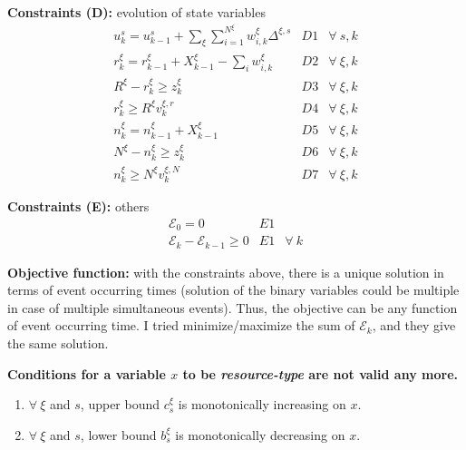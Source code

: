 \documentclass[]{interact}
\theoremstyle{plain}%
\theoremstyle{definition}
\theoremstyle{remark}
\begin{document}
\textbf{Constraints (D):} evolution of state variables
\begin{eqnarray}
u^{s}_{k} = u^s_{k-1} + \sum_{\xi} \sum_{i=1}^{N^{\xi}} w^{\xi}_{i,k} \Delta^{\xi,s}&D1& \forall\ s,k\\
r^{\xi}_k = r^{\xi}_{k-1} + X^{\xi}_{k-1} - \sum_i w^{\xi}_{i,k} &D2& \forall\ \xi,k\\
R^{\xi} - r^{\xi}_k \ge z^{\xi}_k&D3& \forall\ \xi,k\\
r^{\xi}_k  \ge R^{\xi}v^{\xi,r}_k&D4& \forall\ \xi,k\\
n^{\xi}_k = n^{\xi}_{k-1} + X^{\xi}_{k-1} &D5& \forall\ \xi,k\\
N^{\xi} - n^{\xi}_k \ge z^{\xi}_k&D6&\forall\ \xi,k\\
n^{\xi}_k \ge N^{\xi}v^{\xi,N}_k&D7&\forall\ \xi,k
\end{eqnarray}

\textbf{Constraints (E):} others
\begin{eqnarray}
\mathcal{E}_{0} = 0&E1&\\
\mathcal{E}_{k}-\mathcal{E}_{k-1}\ge 0&E1&\forall\ k
\end{eqnarray}


\textbf{Objective function:} with the constraints above, there is a unique solution in terms of event occurring times (solution of the binary variables could be multiple in case of multiple simultaneous events). Thus, the objective can be any function of event occurring time. I tried minimize/maximize the sum of $\mathcal{E}_k$, and they give the same solution.

\textbf{Conditions for a variable $x$ to be \textit{resource-type} are not valid any more.}
\begin{enumerate}
\item $\forall\ \xi$ and $s$, upper bound $c^{\xi}_s$ is monotonically increasing on $x$.
\item  $\forall\ \xi$ and $s$, lower bound $b^{\xi}_s$ is monotonically decreasing on $x$.
\end{enumerate}
\end{document}
